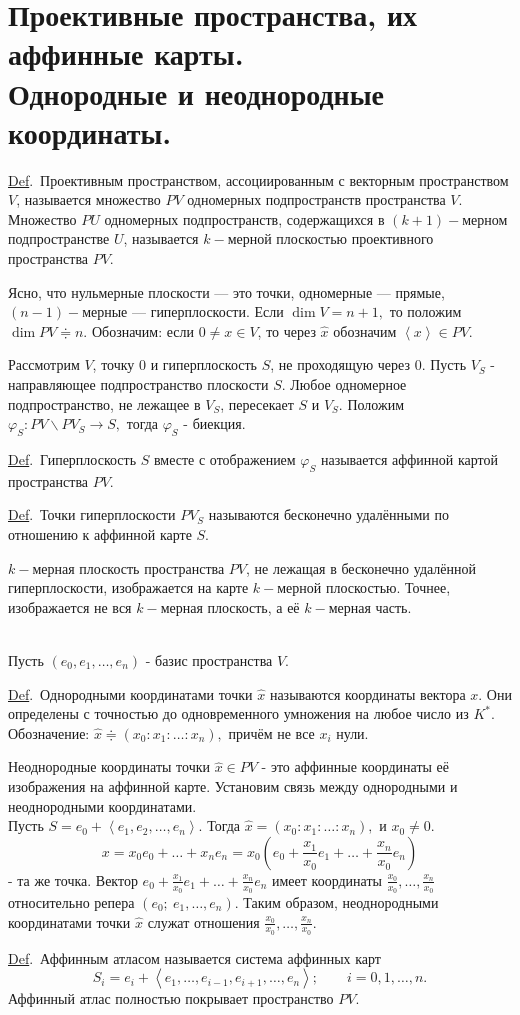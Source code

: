 \documentclass[draft]{article}%
\newcommand{\de}{\par\noindent\underline{Def}.\ }%
\newcommand{\ab}{\par\noindent}%
\renewcommand{\phi}{\varphi}
\newcommand{\nn}[1]{#1_1,#1_2,\dots,#1_n}%
\newcommand{\lob}[1]{\left\langle#1\right\rangle}%
\newcommand{\we}[1]{\widehat{#1}}
\begin{document}
\section{Проективные пространства, их аффинные карты.\\ Однородные и неоднородные координаты.}
\label{q51}
\de Проективным пространством, ассоциированным с векторным пространством $V$, называется множество $PV$ одномерных
подпространств пространства $V$. Множество $PU$ одномерных подпространств, содержащихся в $(k+1)-$мерном подпространстве
$U$, называется $k-$мерной плоскостью проективного пространства $PV.$
\ab Ясно, что нульмерные плоскости --- это точки, одномерные --- прямые, $(n-1)-$мерные --- гиперплоскости.
Если $\dim V=n+1,$ то положим $\dim PV\doteqdot n.$ Обозначим: если $0\ne x\in V$, то через $\we{x}$ обозначим $\lob{x}\in PV.$
\ab Рассмотрим $V$, точку $0$ и гиперплоскость $S$, не проходящую через 0. Пусть $V_S$ - направляющее подпространство
плоскости $S$. Любое одномерное подпространство, не лежащее в $V_S$, пересекает $S$ и $V_S$. Положим $\phi_S: PV\backslash PV_S\rightarrow S,$
тогда $\phi_S$ - биекция.
\de Гиперплоскость $S$ вместе с отображением $\phi_S$ называется аффинной картой пространства $PV.$
\de Точки гиперплоскости $PV_S$ называются бесконечно удалёнными по отношению к аффинной карте $S$.
\ab $k-$мерная плоскость пространства $PV$, не лежащая в бесконечно удалённой гиперплоскости, изображается на
карте $k-$мерной плоскостью. Точнее, изображается не вся $k-$мерная плоскость, а её $k-$мерная часть.
\ab\\ Пусть $(e_0,e_1,\dots,e_n)$ - базис пространства $V$.
\de Однородными координатами точки $\we{x}$ называются координаты вектора $x$. Они определены с точностью до одновременного
умножения на любое число из $K^*.$ Обозначение: $\we{x}\doteqdot (x_0:x_1:\dots:x_n),$
причём не все $x_i$ нули. \ab Неоднородные координаты точки $\we{x}\in PV$ - это аффинные координаты её изображения на
аффинной карте. Установим связь между однородными и неоднородными координатами.\\Пусть $S=e_0+\lob{\nn{e}}.$ Тогда
$\we{x}=(x_0:x_1:\dots:x_n),$ и $x_0\ne 0.$ $$x=x_0e_0+\dots+x_ne_n=x_0\left(e_0+\frac{\displaystyle x_1}{\displaystyle x_0}e_1+\dots+\frac{\displaystyle x_n}{\displaystyle x_0}e_n\right)$$
- та же точка. Вектор $e_0+\frac{\displaystyle x_1}{\displaystyle x_0}e_1+\dots+\frac{\displaystyle x_n}{\displaystyle x_0}e_n$
имеет координаты $\frac{\displaystyle x_0}{\displaystyle x_0},\dots,\frac{\displaystyle x_n}{\displaystyle x_0}$ относительно
репера $(e_0;\ e_1,\dots,e_n).$ Таким образом, неоднородными координатами точки $\we{x}$ служат отношения $\frac{\displaystyle x_0}{\displaystyle x_0},\dots,\frac{\displaystyle x_n}{\displaystyle x_0}.$
\de Аффинным атласом называется система аффинных карт $$S_i=e_i+\lob{e_1,\dots,e_{i-1},e_{i+1},\dots,e_n};\qquad i=0,1,\dots,n.$$
Аффинный атлас полностью покрывает пространство $PV.$
\end{document}
